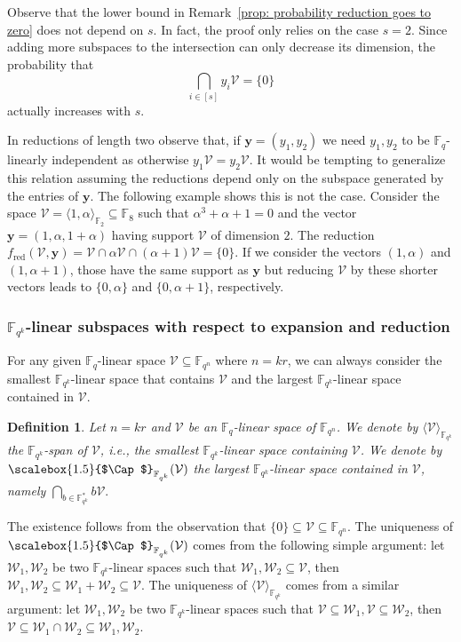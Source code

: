 \documentclass{article}
\newtheorem{definition}{Definition}
\newcommand{\F}{\mathbb{F}}
\newcommand{\Fq}{\mathbb{F}_{q}}
\newcommand{\Fqn}{\mathbb{F}_{q^n}}
\newcommand{\Fqk}{\mathbb{F}_{q^k}}
\newcommand{\calW}{\mathcal{W}}
\newcommand{\calV}{\mathcal{V}}
\newcommand{\fred}{f_{\mathrm{red}}}
\newcommand{\Span}[2]{\langle #2 \rangle_{#1}}
\newcommand{\Core}[1]{\mathop{\scalebox{1.5}{$\Cap$}}\nolimits_{\mathbb{F}_{q^k}}(#1)}
\begin{document}
Observe that the lower bound in Remark~\ref{prop: probability reduction goes to zero} does not depend on $s$. In fact, the proof only relies on the case $s=2$. Since adding more subspaces to the intersection can only decrease its dimension, the probability that
\[
\bigcap_{i\in[s]} y_i\calV=\{0\}
\]
actually increases with $s$.
\\
\par
In reductions of length two observe that, if $\bm y = (y_1,y_2)$ we need $y_1,y_2$ to be $\Fq$-linearly independent as otherwise $y_1 \calV = y_2 \calV.$
It would be tempting to generalize this relation assuming the reductions depend only on the subspace generated by the entries of $\bm y$.
The following example shows this is not the case.
Consider the space $\calV =\Span{\F_2}{1,\alpha} \subseteq \F_{8}$ such that $\alpha^3+\alpha+1=0$ and the vector $\bm y = (1,\alpha,1+\alpha)$ having support $\calV$ of dimension $2$.
The reduction  $\fred(\calV,\bm y) = \calV \cap \alpha \calV \cap (\alpha+1) \calV  = \{ 0\}.$ 
If we consider the vectors $(1,\alpha)$ and $(1, \alpha+ 1)$, those have the same support as $\bm y$ but reducing $\calV$ by these shorter vectors leads to $\{0, \alpha \}$ and $\{0, \alpha + 1 \}$, respectively. 
\subsubsection{$\Fqk$-linear subspaces with respect to expansion and reduction}
\label{subsec: From expansion and reduction to Fqk-linearity}
For any given $\Fq$-linear space $\calV \subseteq \Fqn$ where $n=kr$,
we can always consider the smallest $\Fqk$-linear space that contains $\calV$ and the largest $\Fqk$-linear space contained in $\calV$.
\begin{definition}
    Let $n=kr$ and $\calV$ be an $\Fq$-linear space of $\Fqn$. We denote by $\Span{\Fqk}{\calV}$ the $\Fqk$-span of $\calV$, i.e., the smallest $\Fqk$-linear space containing $\calV$.
    We denote by $\Core{\calV}$ the largest $\Fqk$-linear space contained in $\calV$, namely $\displaystyle\bigcap_{b\in\Fqk^*}b\calV.$ 
\end{definition}
The existence follows from the observation that $ \{0\} \subseteq \calV \subseteq \Fqn$. The uniqueness of $\Core{\calV}$ comes from the following simple argument: let $\calW_1,\calW_2$ be two $\Fqk$-linear spaces such that $\calW_1, \calW_2 \subseteq \calV$, then $\calW_1,\calW_2\subseteq\calW_1 + \calW_2\subseteq\calV$. The uniqueness of $\Span{\Fqk}{\calV}$ comes from a similar argument: let $\calW_1,\calW_2$ be two $\Fqk$-linear spaces such that $\calV \subseteq \calW_1, \calV \subseteq\calW_2$, then $\calV\subseteq \calW_1 \cap \calW_2\subseteq\calW_1,\calW_2$.
\end{document}
